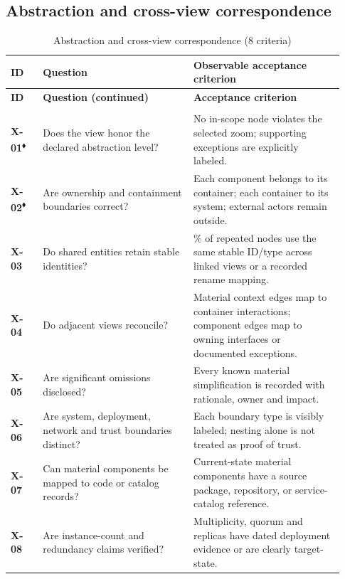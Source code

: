 \documentclass[10pt,letterpaper]{article}
\newcommand{\Gate}{\textsuperscript{\(\blacklozenge\)}}
\newcommand{\CheckRow}[3]{\textbf{\textsf{#1}} & #2 & #3\\[3pt]}
\newcommand{\ChecklistHeader}{\toprule
\textbf{ID} & \textbf{Question} & \textbf{Observable acceptance criterion}\\\midrule
\endfirsthead
\toprule\textbf{ID} & \textbf{Question (continued)} & \textbf{Acceptance criterion}\\\midrule
\endhead
\midrule\multicolumn{3}{r}{\footnotesize Continued on next page}\\\endfoot
\bottomrule\endlastfoot}
\begin{document}
\subsection{Abstraction and cross-view correspondence}
\begin{longtable}{@{}>{\raggedright\arraybackslash}p{0.09\linewidth}>{\raggedright\arraybackslash}p{0.42\linewidth}>{\raggedright\arraybackslash}p{0.42\linewidth}@{}}
\caption{Abstraction and cross-view correspondence (8 criteria)}\label{tab:review-X}\\
\ChecklistHeader
\CheckRow{X-01\Gate}{Does the view honor the declared abstraction level?}{No in-scope node violates the selected zoom; supporting exceptions are explicitly labeled.}
\CheckRow{X-02\Gate}{Are ownership and containment boundaries correct?}{Each component belongs to its container; each container to its system; external actors remain outside.}
\CheckRow{X-03}{Do shared entities retain stable identities?}{100\% of repeated nodes use the same stable ID/type across linked views or a recorded rename mapping.}
\CheckRow{X-04}{Do adjacent views reconcile?}{Material context edges map to container interactions; component edges map to owning interfaces or documented exceptions.}
\CheckRow{X-05}{Are significant omissions disclosed?}{Every known material simplification is recorded with rationale, owner and impact.}
\CheckRow{X-06}{Are system, deployment, network and trust boundaries distinct?}{Each boundary type is visibly labeled; nesting alone is not treated as proof of trust.}
\CheckRow{X-07}{Can material components be mapped to code or catalog records?}{Current-state material components have a source package, repository, or service-catalog reference.}
\CheckRow{X-08}{Are instance-count and redundancy claims verified?}{Multiplicity, quorum and replicas have dated deployment evidence or are clearly target-state.}
\end{longtable}
\end{document}
